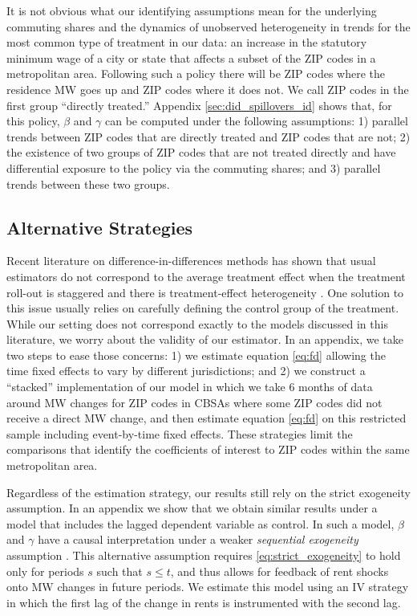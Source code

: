 It is not obvious what our identifying assumptions mean for the underlying 
commuting shares and the dynamics of unobserved heterogeneity in trends for the 
most common type of treatment in our data:
an increase in the statutory minimum wage of a city or state that affects 
a subset of the ZIP codes in a metropolitan area.
Following such a policy there will be ZIP codes where the residence MW goes up
and ZIP codes where it does not.
We call ZIP codes in the first group ``directly treated.''
Appendix \ref{sec:did_spillovers_id} shows that, for this policy, 
$\beta$ and $\gamma$ can be computed under the following assumptions: 
1) parallel trends between ZIP codes that are directly treated and ZIP codes 
that are not;
2) the existence of two groups of ZIP codes that are not treated directly and
have differential exposure to the policy via the commuting shares; and 
3) parallel trends between these two groups.

\subsection{Alternative Strategies}\label{sec:alt_emp_strategies}

Recent literature on difference-in-differences methods has shown that usual
estimators do not correspond to the average treatment effect when the treatment 
roll-out is staggered and there is treatment-effect heterogeneity 
\parencite{deChaisemartinEtAl2022,RothEtAl2022}.
One solution to this issue usually relies on carefully defining the control
group of the treatment.
While our setting does not correspond exactly to the models discussed in this
literature, we worry about the validity of our estimator.
In an appendix, we take two steps to ease those concerns:
1) we estimate equation \eqref{eq:fd} allowing the time fixed effects to vary
by different jurisdictions; and
2) we construct a ``stacked'' implementation of our model in which we take
6 months of data around MW changes for ZIP codes in CBSAs where some ZIP codes 
did not receive a direct MW change, and then estimate equation \eqref{eq:fd} on
this restricted sample including event-by-time fixed effects.
These strategies limit the comparisons that identify the coefficients of 
interest to ZIP codes within the same metropolitan area.

Regardless of the estimation strategy, our results still rely on the 
strict exogeneity assumption.
In an appendix we show that we obtain similar results under a model that 
includes the lagged dependent variable as control.
In such a model, $\beta$ and $\gamma$ have a causal interpretation under a 
weaker \textit{sequential exogeneity} assumption
\parencite{ArellanoBond1991, ArellanoHonore2001}.
This alternative assumption requires \eqref{eq:strict_exogeneity} to hold
only for periods $s$ such that $s \leq t$, and thus allows for feedback of 
rent shocks onto MW changes in future periods.
We estimate this model using an IV strategy in which the first lag of the change
in rents is instrumented with the second lag.


